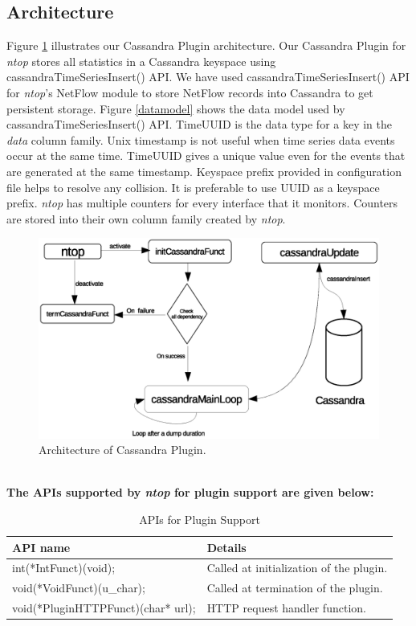       \subsection{Architecture}
      Figure \ref{cassandraArch} illustrates our Cassandra Plugin architecture. Our Cassandra Plugin for \emph{ntop} stores all statistics in a Cassandra keyspace using cassandraTimeSeriesInsert() API. We have used cassandraTimeSeriesInsert() API for \emph{ntop}'s NetFlow module to store NetFlow records into Cassandra to get persistent storage.      
      Figure \ref{datamodel} shows the data model used by cassandraTimeSeriesInsert() API. TimeUUID is the data type for
      a key in the \emph{data} column family. Unix timestamp is not useful when time series data events occur at the same time. TimeUUID gives 
      a unique value even for the events that are generated at the same timestamp. Keyspace prefix provided in configuration file helps to resolve any collision. It is preferable to use UUID as a keyspace prefix. \emph{ntop} has multiple counters
      for every interface that it monitors. Counters are stored into their own column family created by \emph{ntop}.
      \begin{figure}[htb]
            \centering
            \includegraphics[scale = .7]{lfc}
            \caption{Architecture of Cassandra Plugin.} 
            \label{cassandraArch}
      \end{figure}
      \\
      \textbf{The APIs supported by \emph{ntop} for plugin support are given below:}\\
      \begin{table}[ht]
	\centering
	
	\label{ntopplugin}
	\begin{tabular}{|l|l|}
	    \hline
	    \textbf{API name} &  \textbf{Details}\\
	    \hline
	    int(*IntFunct)(void); & Called at initialization of the plugin.\\
	    \hline
	    void(*VoidFunct)(u\_char); & Called at termination of the plugin.\\
	    \hline
	    void(*PluginHTTPFunct)(char* url); & HTTP request handler function.\\
	    \hline
	  \end{tabular}
	  \caption{APIs for Plugin Support}
      \end{table}      

